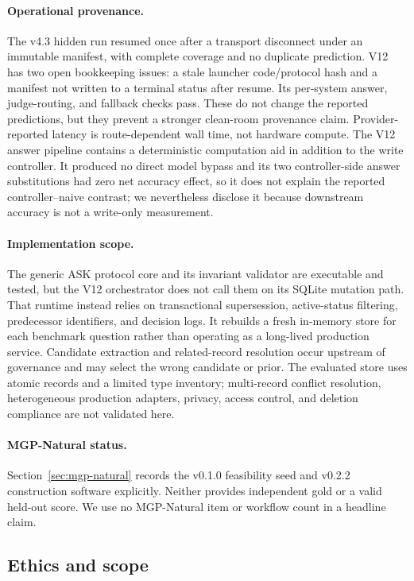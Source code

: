 \paragraph{Operational provenance.}
The v4.3 hidden run resumed once after a transport disconnect under an immutable
manifest, with complete coverage and no duplicate prediction. V12 has two open
bookkeeping issues: a stale launcher code/protocol hash and a manifest not
written to a terminal status after resume. Its per-system answer,
judge-routing, and fallback checks pass. These do not change the reported
predictions, but they prevent a stronger clean-room provenance claim.
Provider-reported latency is route-dependent wall time, not hardware compute.
The V12 answer pipeline contains a deterministic computation aid in addition
to the write controller. It produced no direct model bypass and its two
controller-side answer substitutions had zero net accuracy effect, so it does
not explain the reported controller--naive contrast; we nevertheless disclose
it because downstream accuracy is not a write-only measurement.

\paragraph{Implementation scope.}
The generic ASK protocol core and its invariant validator are executable and
tested, but the V12 orchestrator does not call them on its SQLite mutation path.
That runtime instead relies on transactional supersession, active-status
filtering, predecessor identifiers, and decision logs. It rebuilds a fresh
in-memory store for each benchmark question rather than operating as a
long-lived production service. Candidate extraction and related-record
resolution occur upstream of governance and may select the wrong candidate or
prior. The evaluated store uses atomic records and a limited type inventory;
multi-record conflict resolution, heterogeneous production adapters, privacy,
access control, and deletion compliance are not validated here.

\paragraph{MGP-Natural status.}
Section~\ref{sec:mgp-natural} records the v0.1.0 feasibility seed and v0.2.2
construction software explicitly. Neither provides independent gold or a valid
held-out score. We use no MGP-Natural item or workflow count in a headline
claim.

\subsection{Ethics and scope}

